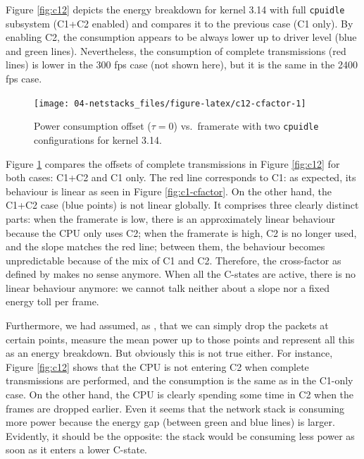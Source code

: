 \documentclass[twoside,nohyper]{tufte-book}
\theoremstyle{definition}
\theoremstyle{definition}
\theoremstyle{definition}
\theoremstyle{remark}
\begin{document}
Figure \ref{fig:c12} depicts the energy breakdown for kernel 3.14 with
full \texttt{cpuidle} subsystem (C1+C2 enabled) and compares it to the
previous case (C1 only). By enabling C2, the consumption appears to be
always lower up to driver level (blue and green lines). Nevertheless,
the consumption of complete transmissions (red lines) is lower in the
300 fps case (not shown here), but it is the same in the 2400 fps case.




\begin{figure}

{\centering \texttt{[image: 04-netstacks\_files/figure-latex/c12-cfactor-1]} 

}

\caption[Power consumption offset (\(\tau=0\)) vs.~framerate
with two \texttt{cpuidle} configurations for kernel 3.14.]{Power consumption offset (\(\tau=0\)) vs.~framerate
with two \texttt{cpuidle} configurations for kernel 3.14.}\label{fig:c12-cfactor}
\end{figure}

Figure \ref{fig:c12-cfactor} compares the offsets of complete
transmissions in Figure \ref{fig:c12} for both cases: C1+C2 and C1 only.
The red line corresponds to C1: as expected, its behaviour is linear as
seen in Figure \ref{fig:c1-cfactor}. On the other hand, the C1+C2 case
(blue points) is not linear globally. It comprises three clearly
distinct parts: when the framerate is low, there is an approximately
linear behaviour because the CPU only uses C2; when the framerate is
high, C2 is no longer used, and the slope matches the red line; between
them, the behaviour becomes unpredictable because of the mix of C1 and
C2. Therefore, the cross-factor as defined by \citet{Serrano2014} makes
no sense anymore. When all the C-states are active, there is no linear
behaviour anymore: we cannot talk neither about a slope nor a fixed
energy toll per frame.

Furthermore, we had assumed, as \citet{Serrano2014}, that we can simply
drop the packets at certain points, measure the mean power up to those
points and represent all this as an energy breakdown. But obviously this
is not true either. For instance, Figure \ref{fig:c12} shows that the
CPU is not entering C2 when complete transmissions are performed, and
the consumption is the same as in the C1-only case. On the other hand,
the CPU is clearly spending some time in C2 when the frames are dropped
earlier. Even it seems that the network stack is consuming more power
because the energy gap (between green and blue lines) is larger.
Evidently, it should be the opposite: the stack would be consuming less
power as soon as it enters a lower C-state.
\end{document}

